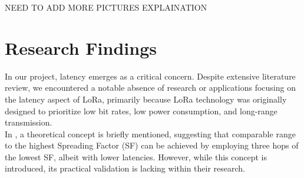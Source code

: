 NEED TO ADD MORE PICTURES EXPLAINATION\\

\section{Research Findings}
\label{sec:Research}
\hspace{12pt} In our project, latency emerges as a critical concern. Despite extensive literature review, we encountered a notable absence of research or applications focusing on the latency aspect of LoRa, primarily because LoRa technology was originally designed to prioritize low bit rates, low power consumption, and long-range transmission.\\

In \cite{farooq}, a theoretical concept is briefly mentioned, suggesting that comparable range to the highest Spreading Factor (SF) can be achieved by employing three hops of the lowest SF, albeit with lower latencies. However, while this concept is introduced, its practical validation is lacking within their research.
